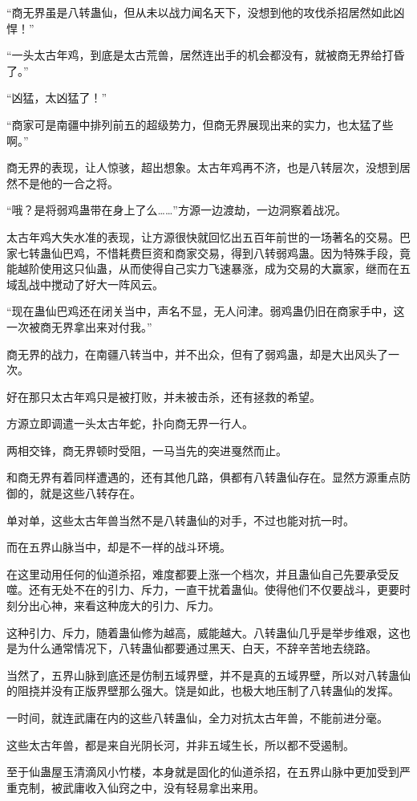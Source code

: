 \begin{this_body}
“商无界虽是八转蛊仙，但从未以战力闻名天下，没想到他的攻伐杀招居然如此凶悍！”

“一头太古年鸡，到底是太古荒兽，居然连出手的机会都没有，就被商无界给打昏了。”

“凶猛，太凶猛了！”

“商家可是南疆中排列前五的超级势力，但商无界展现出来的实力，也太猛了些啊。”

商无界的表现，让人惊骇，超出想象。太古年鸡再不济，也是八转层次，没想到居然不是他的一合之将。

“哦？是将弱鸡蛊带在身上了么……”方源一边渡劫，一边洞察着战况。

太古年鸡大失水准的表现，让方源很快就回忆出五百年前世的一场著名的交易。巴家七转蛊仙巴鸡，不惜耗费巨资和商家交易，得到八转弱鸡蛊。因为特殊手段，竟能越阶使用这只仙蛊，从而使得自己实力飞速暴涨，成为交易的大赢家，继而在五域乱战中搅动了好大一阵风云。

“现在蛊仙巴鸡还在闭关当中，声名不显，无人问津。弱鸡蛊仍旧在商家手中，这一次被商无界拿出来对付我。”

商无界的战力，在南疆八转当中，并不出众，但有了弱鸡蛊，却是大出风头了一次。

好在那只太古年鸡只是被打败，并未被击杀，还有拯救的希望。

方源立即调遣一头太古年蛇，扑向商无界一行人。

两相交锋，商无界顿时受阻，一马当先的突进戛然而止。

和商无界有着同样遭遇的，还有其他几路，俱都有八转蛊仙存在。显然方源重点防御的，就是这些八转存在。

单对单，这些太古年兽当然不是八转蛊仙的对手，不过也能对抗一时。

而在五界山脉当中，却是不一样的战斗环境。

在这里动用任何的仙道杀招，难度都要上涨一个档次，并且蛊仙自己先要承受反噬。还有无处不在的引力、斥力，一直干扰着蛊仙。使得他们不仅要战斗，更要时刻分出心神，来看这种庞大的引力、斥力。

这种引力、斥力，随着蛊仙修为越高，威能越大。八转蛊仙几乎是举步维艰，这也是为什么通常情况下，八转蛊仙都要通过黑天、白天，不辞辛苦地去绕路。

当然了，五界山脉到底还是仿制五域界壁，并不是真的五域界壁，所以对八转蛊仙的阻挠并没有正版界壁那么强大。饶是如此，也极大地压制了八转蛊仙的发挥。

一时间，就连武庸在内的这些八转蛊仙，全力对抗太古年兽，不能前进分毫。

这些太古年兽，都是来自光阴长河，并非五域生长，所以都不受遏制。

至于仙蛊屋玉清滴风小竹楼，本身就是固化的仙道杀招，在五界山脉中更加受到严重克制，被武庸收入仙窍之中，没有轻易拿出来用。


\end{this_body}
